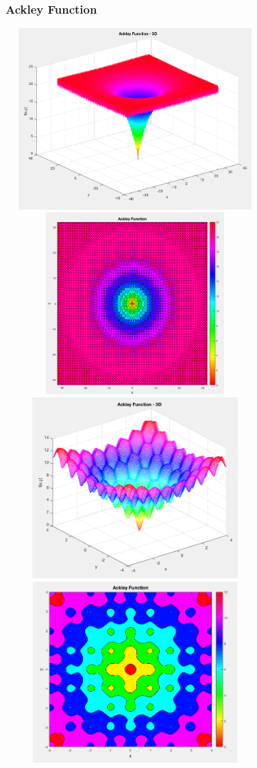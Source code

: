 \documentclass{beamer}
\begin{document}
\begin{frame}
	\frametitle{Ackley Function}
	{
	\centering
	\includegraphics[width=10cm,height=7cm]{ackley1.png}
	}
	\only<2>
	{
	\centering
	\includegraphics[width=10cm,height=7cm]{ackley2.png}
	}	
	\only<3>
	{
	\centering
	\includegraphics[width=10cm,height=7cm]{ackley3.png}
	}
	\only<4>
	{
	\centering
	\includegraphics[width=10cm,height=7cm]{ackley4.png}
	}	
\end{frame}
\end{document}
